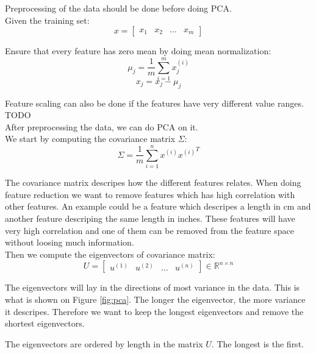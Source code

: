 Preprocessing of the data should be done before doing PCA. \\
Given the training set:
\begin{equation}
x = 
\begin{bmatrix}
x_1 & x_2 & \dots & x_m
\end{bmatrix}
\end{equation}

Ensure that every feature has zero mean by doing mean normalization:
\begin{equation}
\mu_j = \frac{1}{m} \sum^m_{i=1} x_j^{(i)}
\end{equation}
\begin{equation}
x_j = x_j - \mu_j
\end{equation}

Feature scaling can also be done if the features have very different value ranges. TODO \\

After preprocessing the data, we can do PCA on it.\\
We start by computing the covariance matrix $\Sigma$:
\begin{equation}
\Sigma = \frac{1}{m} \sum^n_{i=1} x^{(i)} {x^{(i)}}^T
\end{equation}

The covariance matrix descripes how the different features relates.
When doing feature reduction we want to remove features which has high correlation with other features.
An example could be a feature which descripes a length in cm and another feature descriping the same length in inches.
These features will have very high correlation and one of them can be removed from the feature space without loosing much information. \\

Then we compute the eigenvectors of covariance matrix:
\begin{equation}
U = \begin{bmatrix}
   u^{(1)} & u^{(2)} & \dots & u^{(n)}
 \end{bmatrix}
\in \mathbb{R}^{n \times n}
\end{equation}

The eigenvectors will lay in the directions of most variance in the data.
This is what is shown on Figure \ref{fig:pca}.
The longer the eigenvector, the more variance it descripes.
Therefore we want to keep the longest eigenvectors and remove the shortest eigenvectors.

The eigenvectors are ordered by length in the matrix $U$.
The longest is the first. \\

